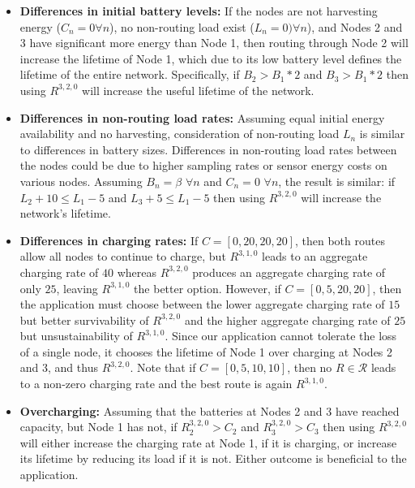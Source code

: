 \begin{itemize}

\item \textbf{Differences in initial battery levels:} If the nodes are not
harvesting energy ($C_n = 0 \forall n$), no non-routing load exist ($L_n = 0)
\forall n$), and Nodes 2 and 3 have significant more energy than Node 1, then
routing through Node 2 will increase the lifetime of Node 1, which due to its
low battery level defines the lifetime of the entire network. Specifically,
if $B_2 > B_1 * 2$ and $B_3 > B_1 * 2$ then using $R^{3,2,0}$ will increase
the useful lifetime of the network.

\item \textbf{Differences in non-routing load rates:} Assuming equal initial
energy availability and no harvesting, consideration of non-routing load
$L_n$ is similar to differences in battery sizes. Differences in non-routing
load rates between the nodes could be due to higher sampling rates or sensor
energy costs on various nodes. Assuming $B_n = \beta$ $\forall n$ and $C_n =
0$ $\forall n$, the result is similar: if $L_2 + 10 \le L_1 - 5$ and $L_3 + 5
\le L_1 - 5$ then using $R^{3,2,0}$ will increase the network's lifetime.

\item \textbf{Differences in charging rates:} If $C = [0, 20, 20, 20]$, then
both routes allow all nodes to continue to charge, but $R^{3,1,0}$ leads to
an aggregate charging rate of $40$ whereas $R^{3,2,0}$ produces an aggregate
charging rate of only $25$, leaving $R^{3,1,0}$ the better option.  However,
if $C = [0, 5, 20, 20]$, then the application must choose between the lower
aggregate charging rate of $15$ but better survivability of $R^{3,2,0}$ and
the higher aggregate charging rate of $25$ but unsustainability of
$R^{3,1,0}$. Since our application cannot tolerate the loss of a single node,
it chooses the lifetime of Node 1 over charging at Nodes 2 and 3, and thus
$R^{3,2,0}$. Note that if $C = [0, 5, 10, 10]$, then no $R \in \mathcal{R}$
leads to a non-zero charging rate and the best route is again $R^{3,1,0}$.

\item \textbf{Overcharging:} Assuming that the batteries at Nodes 2 and 3
have reached capacity, but Node 1 has not, if $R^{3,2,0}_2 > C_2$ and
$R^{3,2,0}_3 > C_3$ then using $R^{3,2,0}$ will either increase the charging
rate at Node 1, if it is charging, or increase its lifetime by reducing its
load if it is not. Either outcome is beneficial to the application.

\end{itemize}


